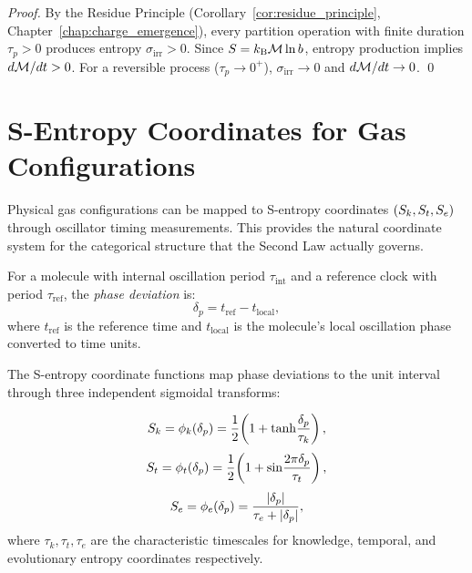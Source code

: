 \begin{proof}
By the Residue Principle (Corollary~\ref{cor:residue_principle}, Chapter~\ref{chap:charge_emergence}),
every partition operation with finite duration $\tau_p > 0$ produces entropy
$\sigma_{\mathrm{irr}} > 0$. Since $S = k_{\mathrm{B}} \mathcal{M} \ln b$, entropy production
implies $d\mathcal{M} / dt > 0$. For a reversible process ($\tau_p \to 0^+$),
$\sigma_{\mathrm{irr}} \to 0$ and $d\mathcal{M}/dt \to 0$. \qed
\end{proof}

\section{S-Entropy Coordinates for Gas Configurations}
\label{sec:sentropy_coordinates_demon}

Physical gas configurations can be mapped to S-entropy coordinates
$(S_k, S_t, S_e)$ through oscillator timing measurements. This provides the
natural coordinate system for the categorical structure that the Second Law
actually governs.

\begin{definition}
\label{def:oscillator_timing}
For a molecule with internal oscillation period $\tau_{\mathrm{int}}$ and a
reference clock with period $\tau_{\mathrm{ref}}$, the \emph{phase deviation}
is:
\begin{equation}
  \delta_p = t_{\mathrm{ref}} - t_{\mathrm{local}},
  \label{eq:phase_deviation}
\end{equation}
where $t_{\mathrm{ref}}$ is the reference time and $t_{\mathrm{local}}$ is the
molecule's local oscillation phase converted to time units.
\end{definition}

The S-entropy coordinate functions map phase deviations to the unit interval
through three independent sigmoidal transforms:

\begin{equation}
  S_k = \phi_k(\delta_p) = \frac{1}{2}\!\left(1 + \tanh\!\frac{\delta_p}{\tau_k}\right),
  \label{eq:Sk_map}
\end{equation}
\begin{equation}
  S_t = \phi_t(\delta_p) = \frac{1}{2}\!\left(1 + \sin\!\frac{2\pi\delta_p}{\tau_t}\right),
  \label{eq:St_map}
\end{equation}
\begin{equation}
  S_e = \phi_e(\delta_p) = \frac{|\delta_p|}{\tau_e + |\delta_p|},
  \label{eq:Se_map}
\end{equation}
where $\tau_k, \tau_t, \tau_e$ are the characteristic timescales for knowledge,
temporal, and evolutionary entropy coordinates respectively.

